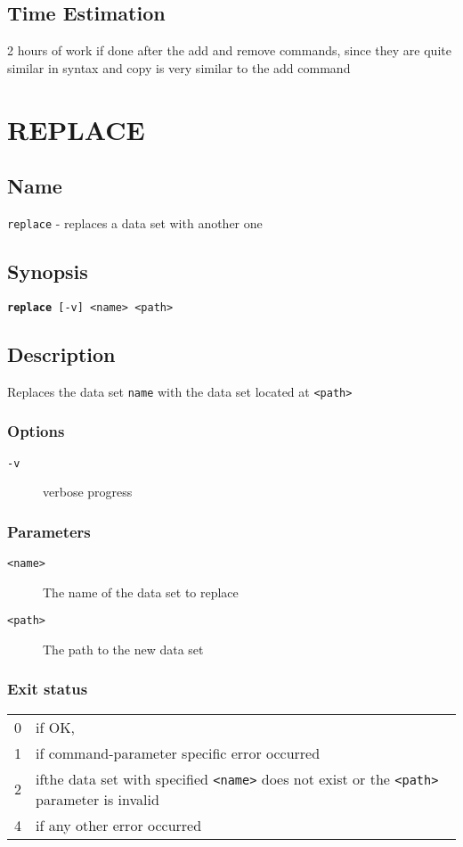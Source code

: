 \documentclass{article} %
\begin{document}
		\subsection*{Time Estimation}
		2 hours of work if done after the add and remove commands, since they are quite similar in syntax and copy is very similar to the add command\\
		\noindent
		
		\newpage
		\section*{REPLACE}
		\subsection*{Name}
		\texttt{replace} - replaces a data set with another one
		\subsection*{Synopsis}
		\texttt{\textbf{replace} [-v] <name> <path>}
		\subsection*{Description}
		Replaces the data set \texttt{name} with the data set located at \texttt{<path>}\\
		
		\noindent
		\subsubsection*{Options}
		\begin{description}
			\item[\texttt{-v}] verbose progress
		\end{description}
		
		\subsubsection*{Parameters}
		\begin{description}
			\item[\texttt{<name>}] The name of the data set to replace
			\item[\texttt{<path>}] The path to the new data set
		\end{description}
		\subsubsection*{Exit status}
		\begin{tabular}{ll}
			0 &  if OK,\\ 
			1 &  if command-parameter specific error occurred\\
			2 &  ifthe data set with specified \texttt{<name>} does not exist or the \texttt{<path>} parameter is invalid\\
			4 &  if any other error occurred\\
		\end{tabular}
\end{document}
